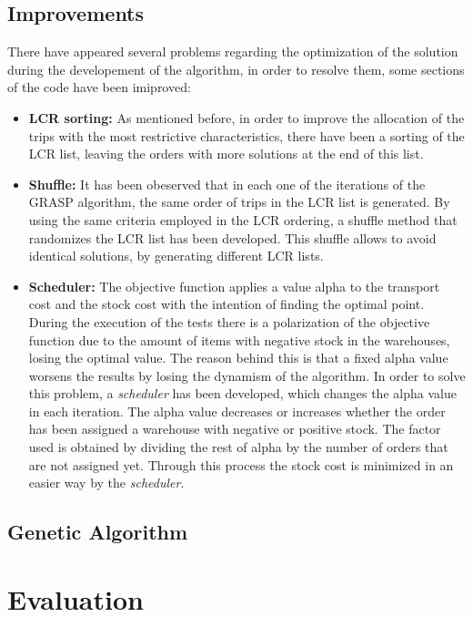 \documentclass[letterpaper]{article} %
\begin{document}
\subsection*{Improvements}
There have appeared several problems regarding the optimization of the solution during the developement of the algorithm, in order to resolve them, some sections of the code have been imiproved:
\begin{itemize}
    \item \textbf{LCR sorting:} As mentioned before, in order to improve the allocation of the trips with the most restrictive characteristics, there have been a sorting of the LCR list, leaving the orders with more solutions at the end of this list.
    \item \textbf{Shuffle:} It has been obeserved that in each one of the iterations of the GRASP algorithm, the same order of trips in the LCR list is generated. By using the same criteria employed in the LCR ordering, a shuffle method that randomizes the LCR list has been developed. This shuffle allows to avoid identical solutions, by generating different LCR lists.
    \item \textbf{Scheduler:} The objective function applies a value alpha to the transport cost and the stock cost with the intention of finding the optimal point. During the execution of the tests there is a polarization of the objective function due to the amount of items with negative stock in the warehouses, losing the optimal value. The reason behind this is that a fixed alpha value worsens the results by losing the dynamism of the algorithm. In order to solve this problem, a \textit{scheduler} has been developed, which changes the alpha value in each iteration. The alpha value decreases or increases whether the order has been assigned a warehouse with negative or positive stock. The factor used is obtained by dividing the rest of alpha by the number of orders that are not assigned yet. Through this process the stock cost is minimized in an easier way by the \textit{scheduler}.
    
\end{itemize}

\subsection*{Genetic Algorithm}



\section*{Evaluation}
\end{document}
